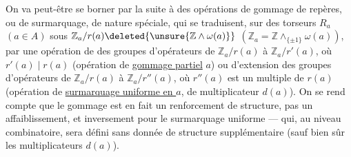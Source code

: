 
On va peut-être se borner par la suite à des opérations de gommage de repères, ou de surmarquage, de nature spéciale, qui se traduisent, sur  des torseurs $R_a$ $(a\in A)$  sous
$\mathbb Z_a/r(a)\deleted{\unsure{\mathbb Z\mathbin{\wedge}\omega(a)}}$
$(\mathbb Z_a=\mathbb Z\mathbin{\wedge}_{\{\pm1\}}\omega(a))$,
par une opération de  des groupes d'opérateurs de $\mathbb Z_a/r(a)$ à $\mathbb Z_a/r'(a)$, où $r'(a)\mid r(a)$
(opération de \uline{gommage partiel}   $a$)
ou d'extension des groupes d'opérateurs de $\mathbb Z_a/r(a)$ à $\mathbb Z_a/r''(a)$, où $r''(a)$  est un multiple de $r(a)$
(opération de \uline{surmarquage uniforme en $a$}, \deleted{)} de multiplicateur $d(a)$).
On se rend compte  que le gommage  est en fait un renforcement de structure, pas un affaiblissement, et inversement pour le surmarquage uniforme --- qui, au niveau combinatoire, sera défini sans donnée de structure supplémentaire (sauf bien sûr les multiplicateurs $d(a)$).
